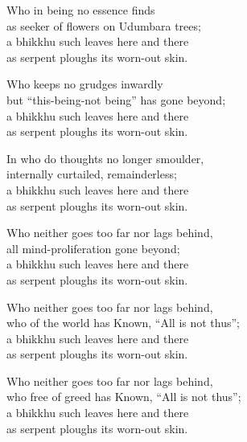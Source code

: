    \begin{MyDescription}{}
   Who in being no essence finds\\
   as seeker of flowers on Udumbara trees;\\
   a bhikkhu such leaves here and there\\
   as serpent ploughs its worn-out skin.
   \end{MyDescription}
   
   \begin{MyDescription}{}
   Who keeps no grudges inwardly\\
   but “this-being-not being” has gone beyond;\\
   a bhikkhu such leaves here and there\\
   as serpent ploughs its worn-out skin.
   \end{MyDescription}
   
   \begin{MyDescription}{}
   In who do thoughts no longer smoulder,\\
   internally curtailed, remainderless;\\
   a bhikkhu such leaves here and there\\
   as serpent ploughs its worn-out skin.
   \end{MyDescription}
   
   \begin{MyDescription}{}
   Who neither goes too far nor lags behind,\\
   all mind-proliferation gone beyond;\\
   a bhikkhu such leaves here and there\\
   as serpent ploughs its worn-out skin.
   \end{MyDescription}
   
   \begin{MyDescription}{}
   Who neither goes too far nor lags behind,\\
   who of the world has Known, “All is not thus”;\\
   a bhikkhu such leaves here and there\\
   as serpent ploughs its worn-out skin.
   \end{MyDescription}
   
   \begin{MyDescription}{}
   Who neither goes too far nor lags behind,\\
   who free of greed has Known, “All is not thus”;\\
   a bhikkhu such leaves here and there\\
   as serpent ploughs its worn-out skin.
   \end{MyDescription}
   
